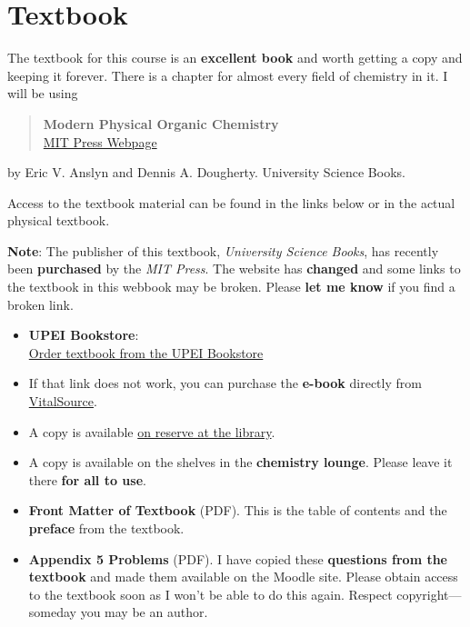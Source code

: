 \section{Textbook}

The textbook for this course is an \textbf{excellent book} and worth getting a copy and keeping it forever. There is a chapter for almost every field of chemistry in it. I will be using

\begin{quote}
\textbf{Modern Physical Organic Chemistry}\\
\href{https://mitpress.mit.edu/9781891389313/modern-physical-organic-chemistry/}{MIT Press Webpage}
\end{quote}

by Eric V. Anslyn and Dennis A. Dougherty. University Science Books.

Access to the textbook material can be found in the links below or in the actual physical textbook.

\textbf{Note}: The publisher of this textbook, \textit{University Science Books}, has recently been \textbf{purchased} by the \textit{MIT Press}. The website has \textbf{changed} and some links to the textbook in this webbook may be broken. Please \textbf{let me know} if you find a broken link.

\begin{itemize}
\item \textbf{UPEI Bookstore}:\\
\href{https://upei.bookware3000.ca/CourseSearch/?course[]=1,2025F,CHEM,CHEM441001,}{Order textbook from the UPEI Bookstore}

\item If that link does not work, you can purchase the \textbf{e-book} directly from\\
\href{https://www.vitalsource.com/en-ca/products/modern-physical-organic-chemistry-eric-v-anslyn-dennis-a-v9781891389306}{VitalSource}.

\item A copy is available \href{https://libraryupei.ca/chemistry-4410-physical-organic-chemistry-fall-2025}{on reserve at the library}.

\item A copy is available on the shelves in the \textbf{chemistry lounge}. Please leave it there \textbf{for all to use}.

\item \textbf{Front Matter of Textbook} (PDF). This is the table of contents and the \textbf{preface} from the textbook.

\item \textbf{Appendix 5 Problems} (PDF). I have copied these \textbf{questions from the textbook} and made them available on the Moodle site. Please obtain access to the textbook soon as I won't be able to do this again. Respect copyright---someday you may be an author.
\end{itemize}

